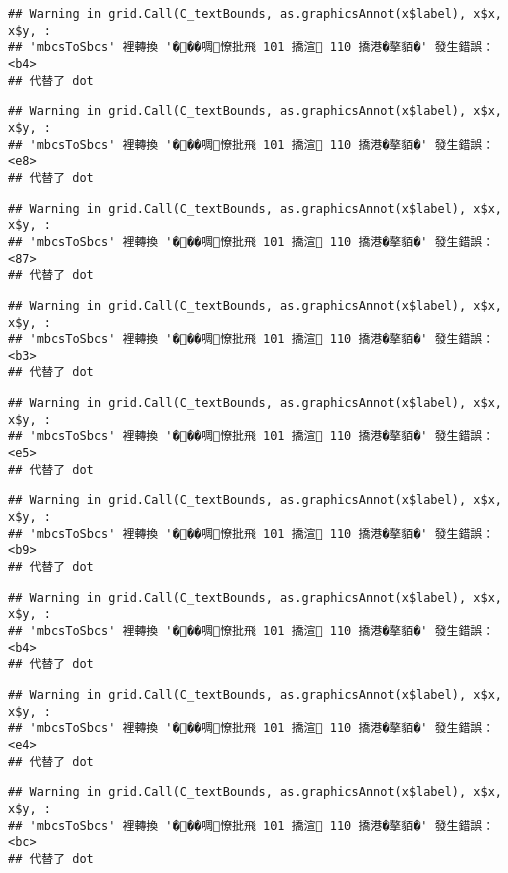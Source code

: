 \documentclass[
]{article}
\begin{document}
\begin{verbatim}
## Warning in grid.Call(C_textBounds, as.graphicsAnnot(x$label), x$x, x$y, :
## 'mbcsToSbcs' 裡轉換 '���啁憭批飛 101 撟渲 110 撟港�摮貊�' 發生錯誤：<b4>
## 代替了 dot
\end{verbatim}

\begin{verbatim}
## Warning in grid.Call(C_textBounds, as.graphicsAnnot(x$label), x$x, x$y, :
## 'mbcsToSbcs' 裡轉換 '���啁憭批飛 101 撟渲 110 撟港�摮貊�' 發生錯誤：<e8>
## 代替了 dot
\end{verbatim}

\begin{verbatim}
## Warning in grid.Call(C_textBounds, as.graphicsAnnot(x$label), x$x, x$y, :
## 'mbcsToSbcs' 裡轉換 '���啁憭批飛 101 撟渲 110 撟港�摮貊�' 發生錯誤：<87>
## 代替了 dot
\end{verbatim}

\begin{verbatim}
## Warning in grid.Call(C_textBounds, as.graphicsAnnot(x$label), x$x, x$y, :
## 'mbcsToSbcs' 裡轉換 '���啁憭批飛 101 撟渲 110 撟港�摮貊�' 發生錯誤：<b3>
## 代替了 dot
\end{verbatim}

\begin{verbatim}
## Warning in grid.Call(C_textBounds, as.graphicsAnnot(x$label), x$x, x$y, :
## 'mbcsToSbcs' 裡轉換 '���啁憭批飛 101 撟渲 110 撟港�摮貊�' 發生錯誤：<e5>
## 代替了 dot
\end{verbatim}

\begin{verbatim}
## Warning in grid.Call(C_textBounds, as.graphicsAnnot(x$label), x$x, x$y, :
## 'mbcsToSbcs' 裡轉換 '���啁憭批飛 101 撟渲 110 撟港�摮貊�' 發生錯誤：<b9>
## 代替了 dot
\end{verbatim}

\begin{verbatim}
## Warning in grid.Call(C_textBounds, as.graphicsAnnot(x$label), x$x, x$y, :
## 'mbcsToSbcs' 裡轉換 '���啁憭批飛 101 撟渲 110 撟港�摮貊�' 發生錯誤：<b4>
## 代替了 dot
\end{verbatim}

\begin{verbatim}
## Warning in grid.Call(C_textBounds, as.graphicsAnnot(x$label), x$x, x$y, :
## 'mbcsToSbcs' 裡轉換 '���啁憭批飛 101 撟渲 110 撟港�摮貊�' 發生錯誤：<e4>
## 代替了 dot
\end{verbatim}

\begin{verbatim}
## Warning in grid.Call(C_textBounds, as.graphicsAnnot(x$label), x$x, x$y, :
## 'mbcsToSbcs' 裡轉換 '���啁憭批飛 101 撟渲 110 撟港�摮貊�' 發生錯誤：<bc>
## 代替了 dot
\end{verbatim}
\end{document}
